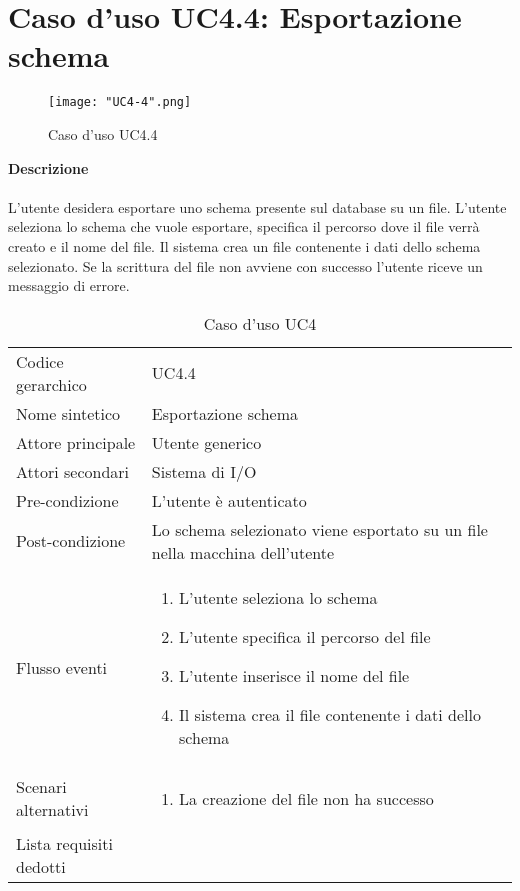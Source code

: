 \documentclass[a4paper]{report}
\begin{document}
	 \section{Caso d'uso UC4.4: Esportazione schema}
	 	\begin{figure}[H]
			\centering
			\texttt{[image: "UC4-4".png]}
			\caption{Caso d'uso UC4.4}
		\end{figure}
	 \textbf{Descrizione} \\ \\
	 L'utente desidera esportare uno schema presente sul database su un file. L'utente seleziona lo schema
	 che vuole esportare, specifica il percorso dove il file verrà creato e il nome del file. Il sistema crea un
	 file contenente i dati dello schema selezionato. Se la scrittura del file non avviene con successo l'utente
	 riceve un messaggio di errore.
		\begin{table}[H]
		\begin{tabularx}{\textwidth}{X | X}\toprule
			\rowcolor{orange!65}Codice gerarchico & UC4.4 \\
			Nome sintetico & Esportazione schema \\
			\rowcolor{orange!65}Attore principale & Utente generico\\
			Attori secondari & Sistema di I/O \\
			\rowcolor{orange!65}Pre-condizione & L'utente è autenticato\\
			Post-condizione & Lo schema selezionato viene esportato su un file nella macchina dell'utente \\
			\rowcolor{orange!65}Flusso eventi & \begin{enumerate}
			\item L'utente seleziona lo schema
			\item L'utente specifica il percorso del file
			\item L'utente inserisce il nome del file
			\item Il sistema crea il file contenente i dati dello schema
			\end{enumerate} \\
			Scenari alternativi & \begin{enumerate}
			\item La creazione del file non ha successo
			\end{enumerate} \\
			\rowcolor{orange!65}Lista requisiti dedotti & \\
			\bottomrule
		\end{tabularx}
		\caption{Caso d'uso UC4}
	 \end{table}
\end{document}
